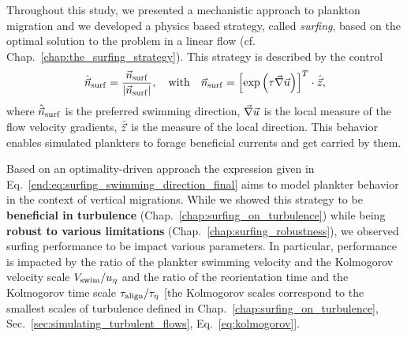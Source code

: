 Throughout this study, we presented a mechanistic approach to plankton migration and we developed a physics based strategy, called \textit{surfing}, based on the optimal solution to the problem in a linear flow (cf. Chap.~\ref{chap:the_surfing_strategy}).
This strategy is described by the control
\begin{equation}
	\label{end:eq:surfing_swimming_direction_final}
	\hat{\vec{n}}_{\mathrm{surf}} = \frac{\vec{n}_{\mathrm{surf}}}{\lvert\vec{n}_{\mathrm{surf}}\rvert}, \quad \text{with} \quad \vec{n}_{\mathrm{surf}} = \left[ \exp \left( \tau \vec{\nabla} \vec{u} \right) \right]^T \cdot \hat{\vec{z}},
\end{equation}
where $\hat{\vec{n}}_{\mathrm{surf}}$ is the preferred swimming direction, $\vec{\nabla} \vec{u}$ is the local measure of the flow velocity gradients, $\hat{\vec{z}}$ is the measure of the local direction.
This behavior enables simulated plankters to forage beneficial currents and get carried by them.

Based on an optimality-driven approach the expression given in Eq.~\ref{end:eq:surfing_swimming_direction_final} aims to model plankter behavior in the context of vertical migrations.
While we showed this strategy to be \textbf{beneficial in turbulence} (Chap.~\ref{chap:surfing_on_turbulence}) while being \textbf{robust to various limitations} (Chap.~\ref{chap:surfing_robustness}), we observed surfing performance to be impact various parameters. 
In particular, performance is impacted by the ratio of the plankter swimming velocity and the Kolmogorov velocity scale $V_{\mathrm{swim}}/u_{\eta}$ and the ratio of the reorientation time and the Kolmogorov time scale $\tau_{\mathrm{align}}/\tau_{\eta}$ [the Kolmogorov scales correspond to the smallest scales of turbulence defined in Chap.~\ref{chap:surfing_on_turbulence}, Sec.~\ref{sec:simulating_turbulent_flows}, Eq.~\eqref{eq:kolmogorov}].

